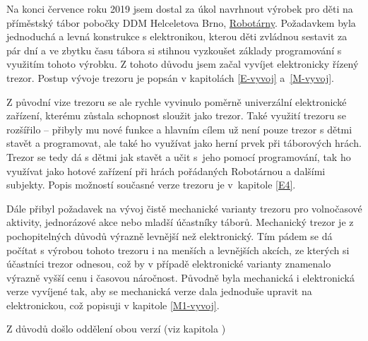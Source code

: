 Na konci července roku 2019 jsem dostal za úkol navrhnout výrobek pro děti na příměstský tábor pobočky DDM Helceletova Brno, \href{https://helceletka.cz/robotarna/}{Robotárny}.
Poža\-dav\-kem byla jednoduchá a levná konstrukce s elektronikou, kterou děti zvládnou sestavit za pár dní a ve zbytku času tábora si stihnou vyzkoušet základy programování 
s využitím tohoto výrobku. Z tohoto důvodu jsem začal vyvíjet elektronicky řízený trezor. Postup vývoje trezoru je popsán v kapitolách \ref{E-vyvoj} a~\ref{M-vyvoj}.

Z původní vize trezoru se ale rychle vyvinulo poměrně univerzální elektronické zařízení, kterému zůstala schopnost sloužit jako trezor.
Také využití trezoru se rozšířilo -- přibyly mu nové funkce a hlavním cílem už není pouze trezor  s dětmi stavět a programovat, 
ale také ho využívat jako herní prvek při táborových hrách. 
Trezor se tedy dá s dětmi jak stavět a učit s~jeho pomocí programování, tak ho využívat jako hotové zařízení při hrách pořádaných Robotárnou a dalšími subjekty.
Popis možností současné verze trezoru je v~kapitole \ref{E4}.

Dále přibyl požadavek na vývoj čistě mechanické varianty trezoru pro volnočasové aktivity, jednorázové akce nebo mladší účastníky táborů.
Mechanický trezor je z pochopitelných důvodů výrazně levnější než elektronický. Tím pádem se dá počítat s výrobou tohoto trezoru i na menších a levnějších akcích, ze kterých 
si účastníci trezor odnesou, což by v případě elektronické varianty znamenalo výrazně vyšší cenu i časovou náročnost.
Původně byla mechanická i elektronická verze vyvíjené tak, aby se mechanická verze dala jednoduše upravit na elektronickou, což popisuji v kapitole \ref{M1-vyvoj}.

Z důvodů %
došlo oddělení obou verzí (viz kapitola %
)


